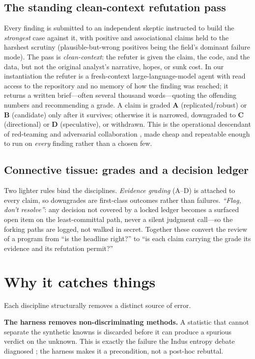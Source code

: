 \documentclass[11pt]{article}
\begin{document}
\subsection{The standing clean-context refutation pass}
Every finding is submitted to an independent skeptic instructed to build the
\emph{strongest} case against it, with positive and associational claims held to the
harshest scrutiny (plausible-but-wrong positives being the field's dominant failure mode).
The pass is \emph{clean-context}: the refuter is given the claim, the code, and the data,
but not the original analyst's narrative, hopes, or sunk cost. In our instantiation the
refuter is a fresh-context large-language-model agent with read access to the repository and
no memory of how the finding was reached; it returns a written brief---often several
thousand words---quoting the offending numbers and recommending a grade. A claim is graded
\textbf{A} (replicated/robust) or \textbf{B} (candidate) only after it survives; otherwise it
is narrowed, downgraded to \textbf{C} (directional) or \textbf{D} (speculative), or withdrawn.
This is the operational descendant of red-teaming and adversarial collaboration
\citep{mellers2001adversarial}, made cheap and repeatable enough to run on \emph{every}
finding rather than a chosen few.

\subsection{Connective tissue: grades and a decision ledger}
Two lighter rules bind the disciplines. \emph{Evidence grading} (A--D) is attached to every
claim, so downgrades are first-class outcomes rather than failures. \emph{``Flag, don't
resolve''}: any decision not covered by a locked ledger becomes a surfaced open item on the
least-committal path, never a silent judgment call---so the forking paths are logged, not
walked in secret. Together these convert the review of a program from ``is the headline
right?'' to ``is each claim carrying the grade its evidence and its refutation permit?''

\section{Why it catches things}
Each discipline structurally removes a distinct source of error.

\textbf{The harness removes non-discriminating methods.} A statistic that cannot separate
the synthetic knowns is discarded before it can produce a spurious verdict on the unknown.
This is exactly the failure the Indus entropy debate diagnosed
\citep{rao2009entropic,sproat2014statistical}; the harness makes it a precondition, not a
post-hoc rebuttal.
\end{document}
